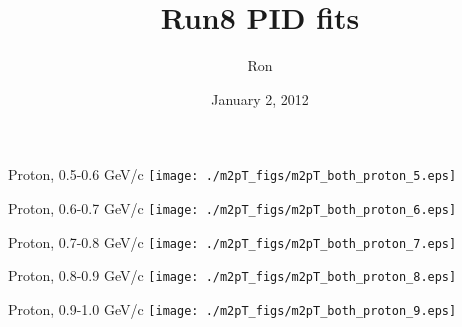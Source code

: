 \documentclass[compress]{beamer} %
\title[2 January 2012 - Slide \insertframenumber]{Run8 PID fits}
\author[Ron]{Ron}
\date{January 2, 2012}
\begin{document}
\begin{frame}
\titlepage
\end{frame}









\begin{frame}{Proton, 0.5-0.6 GeV/c}
\texttt{[image: ./m2pT\_figs/m2pT\_both\_proton\_5.eps]}
\end{frame}
\begin{frame}{Proton, 0.6-0.7 GeV/c}
\texttt{[image: ./m2pT\_figs/m2pT\_both\_proton\_6.eps]}
\end{frame}
\begin{frame}{Proton, 0.7-0.8 GeV/c}
\texttt{[image: ./m2pT\_figs/m2pT\_both\_proton\_7.eps]}
\end{frame}
\begin{frame}{Proton, 0.8-0.9 GeV/c}
\texttt{[image: ./m2pT\_figs/m2pT\_both\_proton\_8.eps]}
\end{frame}
\begin{frame}{Proton, 0.9-1.0 GeV/c}
\texttt{[image: ./m2pT\_figs/m2pT\_both\_proton\_9.eps]}
\end{frame}
\end{document}
